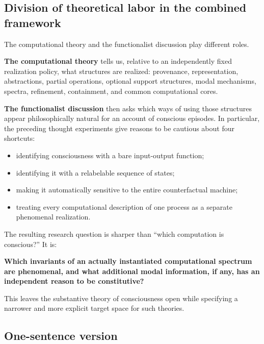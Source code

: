 \documentclass[11pt,a4paper]{article}
\newcounter{thought}
\begin{document}
\subsection{Division of theoretical labor in the combined framework}

The computational theory and the functionalist discussion play different roles.

\textbf{The computational theory} tells us, relative to an independently fixed realization policy, what structures are realized: provenance, representation, abstractions, partial operations, optional support structures, modal mechanisms, spectra, refinement, containment, and common computational cores.

\textbf{The functionalist discussion} then asks which ways of using those structures appear philosophically natural for an account of conscious episodes. In particular, the preceding thought experiments give reasons to be cautious about four shortcuts:

\begin{itemize}
  \item identifying consciousness with a bare input-output function;
  \item identifying it with a relabelable sequence of states;
  \item making it automatically sensitive to the entire counterfactual machine;
  \item treating every computational description of one process as a separate phenomenal realization.
\end{itemize}

The resulting research question is sharper than ``which computation is conscious?'' It is:

\begin{center}
\textbf{Which invariants of an actually instantiated computational spectrum are phenomenal, and what additional modal information, if any, has an independent reason to be constitutive?}
\end{center}

This leaves the substantive theory of consciousness open while specifying a narrower and more explicit target space for such theories.

\subsection*{One-sentence version}

\begin{center}
\end{center}
\end{document}
